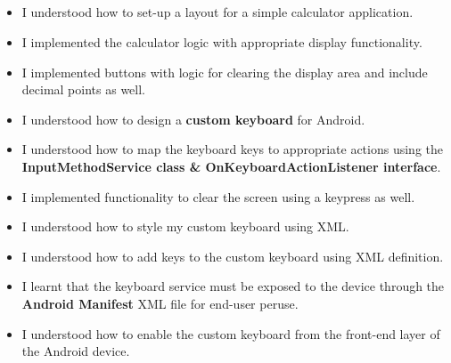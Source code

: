 \documentclass[12pt, a4]{article}
\begin{document}
\subsection*{}
\begin{itemize}
\item I understood how to set-up a layout for a simple calculator application.
\item I implemented the calculator logic with appropriate display functionality.
\item I implemented buttons with logic for clearing the display area and include decimal points as well.
\item I understood how to design a \textbf{custom keyboard} for Android.
\item I understood how to map the keyboard keys to appropriate actions using the \textbf{InputMethodService class \& OnKeyboardActionListener interface}.
\item I implemented functionality to clear the screen using a keypress as well.
\item I understood how to style my custom keyboard using XML.
\item I understood how to add keys to the custom keyboard using XML definition.
\item I learnt that the keyboard service must be exposed to the device through the \textbf{Android Manifest} XML file for end-user peruse.
\item I understood how to enable the custom keyboard from the front-end layer of the Android device.
\end{itemize}
\end{document}

